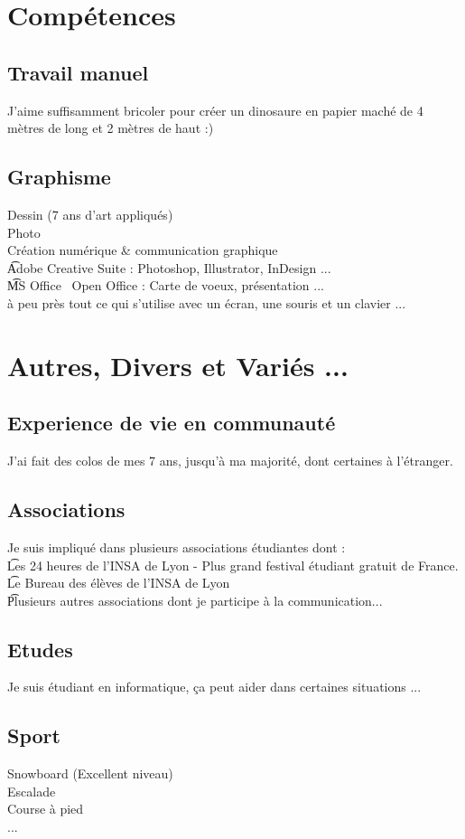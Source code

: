 \section{Comp\'etences}

	\subsection{Travail manuel}
		{J'aime suffisamment bricoler pour cr\'{e}er un dinosaure en papier mach\'{e} de 4 m\`{e}tres de long et 2 m\`{e}tres de haut :)}

	\subsection{Graphisme}
		{Dessin (7 ans d'art appliqu\'es)\\
		 Photo\\
		 Cr\'{e}ation num\'{e}rique \& communication graphique\\
		 \t Adobe Creative Suite : Photoshop, Illustrator, InDesign ...\\
		 \t MS Office \ Open Office : Carte de voeux, pr\'esentation ...\\
		 \`a peu pr\`es tout ce qui s'utilise avec un \'ecran, une souris et un clavier ...}
				
\section{Autres, Divers et Vari\'{e}s ...}
	\subsection{Experience de vie en communaut\'e}
		{J'ai fait des colos de mes 7 ans, jusqu'\`a ma majorit\'{e}, dont certaines \`a l'\'etranger.}
		
	\subsection{Associations}
		{Je suis impliqu\'{e} dans plusieurs associations \'etudiantes dont :\\
			\t Les 24 heures de l'INSA de Lyon - Plus grand festival \'etudiant gratuit de France.\\
			\t Le Bureau des \'{e}l\`{e}ves de l'INSA de Lyon\\
			\t Plusieurs autres associations dont je participe \`{a} la communication...}
		
	\subsection{Etudes}
		{Je suis \'etudiant en informatique, \c{c}a peut aider dans certaines situations ...}
		
	\subsection{Sport}
		{Snowboard (Excellent niveau)\\
		 Escalade\\
		 Course \`a pied\\
		 ...}

